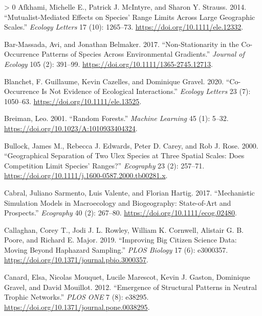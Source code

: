 \documentclass[12pt]{article}
\newlength{\cslhangindent}
\newenvironment{CSLReferences}[3] %
 {%
  \setlength{\parindent}{0pt}
  \ifodd #1 \everypar{\setlength{\hangindent}{\cslhangindent}}\ignorespaces\fi
  \ifnum #2 > 0
  \setlength{\parskip}{#2\baselineskip}
  \fi
 }%
 {}
\begin{document}
\hypertarget{refs}{}
\begin{CSLReferences}{1}{0}
\leavevmode\hypertarget{ref-Afkhami2014MutEff}{}%
Afkhami, Michelle E., Patrick J. McIntyre, and Sharon Y. Strauss. 2014.
{``Mutualist-Mediated Effects on Species' Range Limits Across Large
Geographic Scales.''} \emph{Ecology Letters} 17 (10): 1265--73.
\url{https://doi.org/10.1111/ele.12332}.

\leavevmode\hypertarget{ref-Bar-Massada2017NonCoo}{}%
Bar-Massada, Avi, and Jonathan Belmaker. 2017. {``Non-Stationarity in
the Co-Occurrence Patterns of Species Across Environmental Gradients.''}
\emph{Journal of Ecology} 105 (2): 391--99.
\url{https://doi.org/10.1111/1365-2745.12713}.

\leavevmode\hypertarget{ref-Blanchet2020CooNot}{}%
Blanchet, F. Guillaume, Kevin Cazelles, and Dominique Gravel. 2020.
{``Co-Occurrence Is Not Evidence of Ecological Interactions.''}
\emph{Ecology Letters} 23 (7): 1050--63.
\url{https://doi.org/10.1111/ele.13525}.

\leavevmode\hypertarget{ref-Breiman2001RanFor}{}%
Breiman, Leo. 2001. {``Random Forests.''} \emph{Machine Learning} 45
(1): 5--32. \url{https://doi.org/10.1023/A:1010933404324}.

\leavevmode\hypertarget{ref-Bullock2000GeoSep}{}%
Bullock, James M., Rebecca J. Edwards, Peter D. Carey, and Rob J. Rose.
2000. {``Geographical Separation of Two Ulex Species at Three Spatial
Scales: Does Competition Limit Species' Ranges?''} \emph{Ecography} 23
(2): 257--71. \url{https://doi.org/10.1111/j.1600-0587.2000.tb00281.x}.

\leavevmode\hypertarget{ref-Cabral2017MecSim}{}%
Cabral, Juliano Sarmento, Luis Valente, and Florian Hartig. 2017.
{``Mechanistic Simulation Models in Macroecology and Biogeography:
State-of-Art and Prospects.''} \emph{Ecography} 40 (2): 267--80.
\url{https://doi.org/10.1111/ecog.02480}.

\leavevmode\hypertarget{ref-Callaghan2019ImpBig}{}%
Callaghan, Corey T., Jodi J. L. Rowley, William K. Cornwell, Alistair G.
B. Poore, and Richard E. Major. 2019. {``Improving Big Citizen Science
Data: Moving Beyond Haphazard Sampling.''} \emph{PLOS Biology} 17 (6):
e3000357. \url{https://doi.org/10.1371/journal.pbio.3000357}.

\leavevmode\hypertarget{ref-Canard2012EmeStr}{}%
Canard, Elsa, Nicolas Mouquet, Lucile Marescot, Kevin J. Gaston,
Dominique Gravel, and David Mouillot. 2012. {``Emergence of Structural
Patterns in Neutral Trophic Networks.''} \emph{PLOS ONE} 7 (8): e38295.
\url{https://doi.org/10.1371/journal.pone.0038295}.


\end{CSLReferences}
\end{document}
